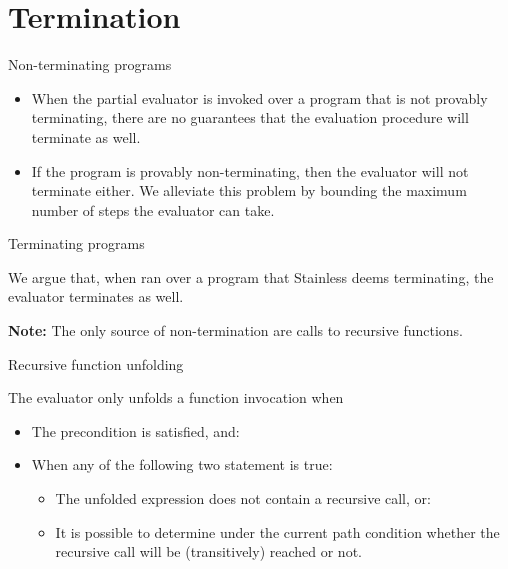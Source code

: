 \documentclass[ignorenonframetext,]{beamer}
\providecommand{\tightlist}{%
  \setlength{\itemsep}{0pt}\setlength{\parskip}{0pt}}
\begin{document}
\hypertarget{termination}{%
\section{Termination}\label{termination}}

\begin{frame}{%
\protect\hypertarget{non-terminating-programs}{%
Non-terminating programs}}

\begin{itemize}
\tightlist
\item
  When the partial evaluator is invoked over a program that is not
  provably terminating, there are no guarantees that the evaluation
  procedure will terminate as well.
\item
  If the program is provably non-terminating, then the evaluator will
  not terminate either. We alleviate this problem by bounding the
  maximum number of steps the evaluator can take.
\end{itemize}

\end{frame}

\begin{frame}{%
\protect\hypertarget{terminating-programs}{%
Terminating programs}}

We argue that, when ran over a program that Stainless deems terminating,
the evaluator terminates as well. \vspace{20pt}

\textbf{Note:} The only source of non-termination are calls to recursive
functions.

\end{frame}

\begin{frame}{%
\protect\hypertarget{recursive-function-unfolding}{%
Recursive function unfolding}}

The evaluator only unfolds a function invocation when

\begin{itemize}
\tightlist
\item
  The precondition is satisfied, and:
\item
  When any of the following two statement is true:

  \begin{itemize}
  \tightlist
  \item
    The unfolded expression does not contain a recursive call, or:
  \item
    It is possible to determine under the current path condition whether
    the recursive call will be (transitively) reached or not.
  \end{itemize}
\end{itemize}

\end{frame}
\end{document}
